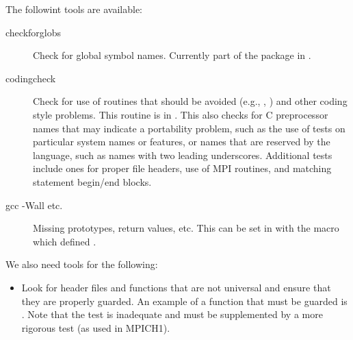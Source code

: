 \documentclass{article}
\begin{document}
The followint tools are available:
\begin{description}
\item[checkforglobs]Check for global symbol names.  Currently part of the
   package in . 
\item[codingcheck]Check for use of routines that should be avoided
  (e.g., , 
) and other coding style problems.  This routine is in
.  This also checks for C preprocessor names that
may indicate a portability problem, such as the use of tests on
particular system names or features, or names that are reserved by the
  language, such as names with two leading underscores.  Additional
  tests include ones for proper file headers, use of MPI routines, and
  matching statement begin/end blocks.


\item[gcc -Wall etc.]Missing prototypes, return values, etc.  This can be set
  in  with the  macro which
  defined .
\end{description}

We also need tools for the following:
\begin{itemize}
\item Look for header files and functions that are not universal and
  ensure that they are properly guarded.
  An example of a function that must be guarded is .
Note that the  test is inadequate and must be supplemented
by a more rigorous test (as used in MPICH1).
\end{itemize}
\end{document}
